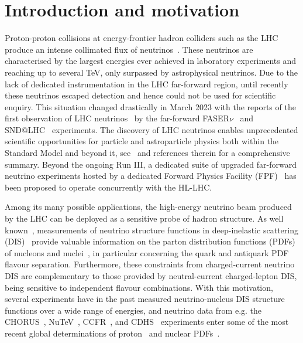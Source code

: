 \section{Introduction and motivation}
\label{sec:introduction}

Proton-proton collisions at energy-frontier hadron colliders
such as the LHC produce an intense collimated flux of neutrinos~\cite{Kling:2021gos}.
%
These neutrinos are characterised by the largest energies ever achieved in laboratory experiments
and reaching up to  several TeV, only surpassed by astrophysical neutrinos.
%
Due to the lack of dedicated instrumentation in the LHC far-forward region,
until recently these neutrinos escaped detection and hence could not be used
for scientific enquiry.
%
This situation changed drastically in  March 2023
with the reports of the first observation of LHC neutrinos~\cite{FASER:2023zcr} by the
far-forward  FASER$\nu$~\cite{FASER:2019dxq} and SND@LHC~\cite{SHiP:2020sos} experiments.
%
The discovery of LHC neutrinos enables
unprecedented scientific opportunities
for particle and astroparticle physics both within the Standard Model and beyond it,
see~\cite{Anchordoqui:2021ghd,Feng:2022inv}
and references therein for a comprehensive summary.
%
Beyond the ongoing Run III, a dedicated suite of upgraded far-forward
neutrino experiments hosted by a dedicated
Forward Physics Facility (FPF)~\cite{Anchordoqui:2021ghd,Feng:2022inv} has been
proposed to operate concurrently with the HL-LHC.

Among its many possible applications, the high-energy neutrino beam produced by the LHC
can be deployed as a sensitive probe of hadron structure.
%
As well known~\cite{Conrad:1997ne,Mangano:2001mj},
measurements of neutrino structure functions in deep-inelastic scattering
(DIS)~\cite{Candido:2023utz} provide valuable information on the parton distribution functions (PDFs)
of nucleons and nuclei~\cite{Ethier:2020way,Gao:2017yyd,Kovarik:2019xvh}, in particular
concerning the quark and antiquark PDF flavour separation.
%
Furthermore, these constraints from charged-current neutrino DIS are complementary to those
provided by neutral-current charged-lepton DIS, being sensitive to independent
flavour combinations.
%
With this motivation, several  experiments have in the past measured neutrino-nucleus
DIS structure functions over a wide range of energies, and neutrino data
from e.g. the CHORUS~\cite{CHORUS:2005cpn}, NuTeV~\cite{NuTeV:2001dfo},
CCFR~\cite{Yang:2000ju}, and CDHS~\cite{Berge:1989hr} experiments enter 
some of the most recent global determinations of proton~\cite{Hou:2019efy,Bailey:2020ooq,NNPDF:2021njg} and
nuclear PDFs~\cite{AbdulKhalek:2022fyi,Eskola:2021nhw,Muzakka:2022wey}.

